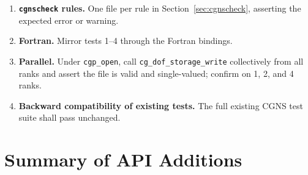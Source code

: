 \documentclass[11pt,letterpaper]{article}
\begin{document}
\begin{enumerate}[leftmargin=2em]
\item \textbf{\texttt{cgnscheck} rules.}  One file per rule in
  Section~\ref{sec:cgnscheck}, asserting the expected error or
  warning.

\item \textbf{Fortran.}  Mirror tests 1--4 through the Fortran
  bindings.

\item \textbf{Parallel.}  Under \texttt{cgp\_open}, call
  \texttt{cg\_dof\_storage\_write} collectively from all ranks and
  assert the file is valid and single-valued; confirm on 1, 2, and 4
  ranks.

\item \textbf{Backward compatibility of existing tests.}  The full
  existing CGNS test suite shall pass unchanged.
\end{enumerate}

\section{Summary of API Additions}
\end{document}
